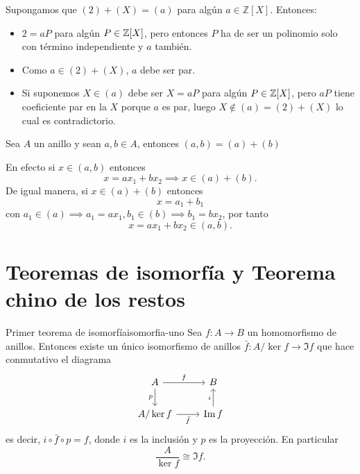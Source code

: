 \begin{proofbox}
    Supongamos que \((2) + (X) = (a)\) para algún \(a \in \mathbb{Z}[X]\). Entonces:
    \begin{itemize}
        \item \(2 = aP\) para algún \(P \in \mathbb{Z}[X]\), pero entonces $P$ ha de ser un polinomio solo con término independiente y \(a\) también.
        \item Como $a \in (2) + (X)$, $a$ debe ser par. 
        \item Si suponemos \(X \in (a)\) debe ser $X = aP$ para algún \(P \in \mathbb{Z}[X]\), pero $aP$ tiene coeficiente par en la $X$ porque $a$ es par, luego $X \notin (a) = (2) + (X)$ lo cual es contradictorio.
    \end{itemize}
\end{proofbox}

\begin{example}{}{}
    Sea $A$ un anillo y sean $a,b \in A$, entonces $(a,b) = (a) + (b)$
\end{example}

\begin{proofbox}
    En efecto si $x \in (a,b)$ entonces
    \[
    x = a x_1 + b x_2 \implies x \in (a) + (b).
    \]
    De igual manera, si $x \in (a) + (b)$ entonces
    \[
    x = a_1 + b_1 
    \]
    con $a_1 \in (a) \implies a_1 = a x_1, b_1 \in (b) \implies b_1 = b x_2$, por tanto
    \[
    x = ax_1 + bx_2 \in (a,b).
    \]
\end{proofbox}

\clearpage
\section{Teoremas de isomorfía y Teorema chino de los restos}

\begin{theorem}{Primer teorema de isomorfía}{isomorfia-uno}
Sea $f : A \to B$ un homomorfismo de anillos. Entonces existe un único isomorfismo de anillos $\bar{f} : A/\ker f \to \Im f$ que hace conmutativo el diagrama
\[
\begin{tikzcd}
A \arrow[r, "f"] \arrow[d, "p"'] & B \\
A/\ker f \arrow[r, "\bar{f}"'] & \Im f \arrow[u, "i"]
\end{tikzcd}
\]
es decir, $i \circ \bar{f} \circ p = f$, donde $i$ es la inclusión y $p$ es la proyección. En particular
\[
\frac{A}{\ker f} \cong \Im f.
\]
\end{theorem}

